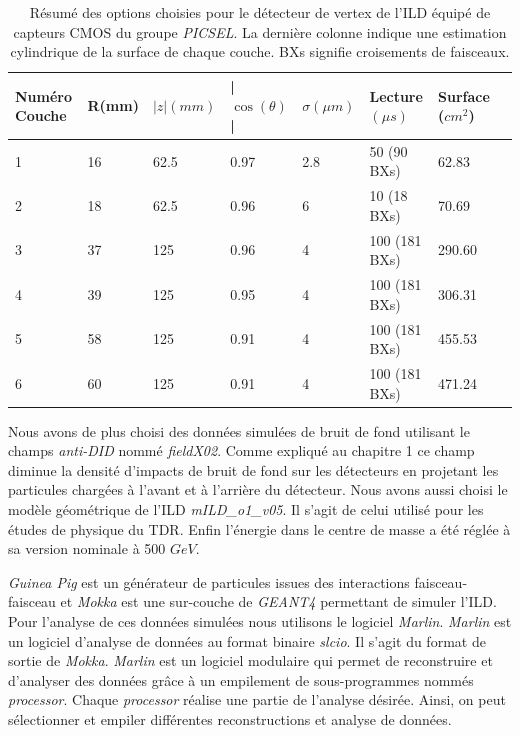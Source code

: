   \begin{table}[h]
  \centering
   \footnotesize
   \begin{tabular}{|l|l|l|l|l|l|l|l|}
   \hline
   Numéro Couche & R(mm) & $|z|(mm)$ & | $\cos(\theta)$| & $\sigma (\mu m)$ & Lecture $(\mu s)$ & Surface ($cm^2$)       \\ \hline
   1             & 16    & 62.5    & 0.97      & 2.8   & 50 (90 BXs)                    & 62.83  \\ \hline
   2             & 18    & 62.5    & 0.96      & 6     & 10 (18 BXs)                    & 70.69  \\ \hline
   3             & 37    & 125     & 0.96      & 4     & 100 (181 BXs)                  & 290.60 \\ \hline
   4             & 39    & 125     & 0.95      & 4     & 100 (181 BXs)                  & 306.31 \\ \hline
   5             & 58    & 125     & 0.91      & 4     & 100 (181 BXs)                  & 455.53 \\ \hline
   6             & 60    & 125     & 0.91      & 4     & 100 (181 BXs)                  & 471.24 \\ \hline
   \end{tabular}
   \caption{R\'esum\'e des options choisies pour le d\'etecteur de vertex de l'ILD \'equipé de capteurs CMOS du groupe \textit{PICSEL}. La derni\`ere colonne indique une estimation cylindrique de la surface de chaque couche. BXs signifie croisements de faisceaux.}
   \label{tab:detecteurVertex2}
 \end{table}
 
\medskip

  Nous avons de plus choisi des donn\'ees simul\'ees de bruit de fond utilisant le champs \textit{anti-DID} nomm\'e \textit{fieldX02}. Comme expliqu\'e au chapitre 1 ce champ diminue la densit\'e d'impacts de bruit de fond sur les d\'etecteurs en projetant les particules charg\'ees \`a l'avant et \`a l'arri\`ere du d\'etecteur. Nous avons aussi choisi le mod\`ele g\'eom\'etrique de l'ILD  \textit{mILD\_o1\_v05}. Il s'agit de celui utilis\'e pour les \'etudes de physique du TDR. Enfin l'\'energie dans le centre de masse a \'et\'e r\'egl\'ee \`a sa version nominale \`a 500 $GeV$.

  \medskip

  \textit{Guinea Pig} est un g\'en\'erateur de particules issues des interactions faisceau-faisceau et \textit{Mokka} est une sur-couche de \textit{GEANT4} permettant de simuler l'ILD. Pour l'analyse de ces donn\'ees simul\'ees nous utilisons le logiciel \textit{Marlin}\cite{Behnke:2007zz}. \textit{Marlin} est un logiciel d'analyse de donn\'ees au format binaire \textit{slcio}. Il s'agit du format de sortie de \textit{Mokka}. \textit{Marlin} est un logiciel modulaire qui permet de reconstruire et d'analyser des donn\'ees gr\^ace \`a un empilement de sous-programmes nomm\'es \textit{processor}. Chaque \textit{processor} r\'ealise une partie de l'analyse d\'esir\'ee. Ainsi, on peut s\'electionner et empiler diff\'erentes reconstructions et analyse de donn\'ees.

